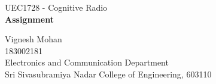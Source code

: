 \documentclass[a4paper]{article}
\begin{document}

\Large
 \begin{center}
UEC1728 - Cognitive Radio\\
\textbf{Assignment}

\hspace{10pt}

\large
Vignesh Mohan\\
\smallskip
\small
183002181\\
\small
Electronics and Communication Department\\
\small
Sri Sivasubramiya Nadar College of Engineering, 603110\\
\end{center}

\hspace{10pt}
\normalsize
{}

\end{document}
